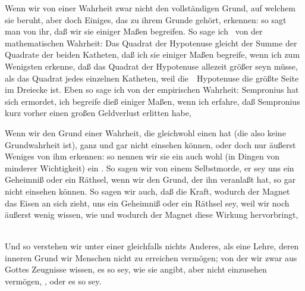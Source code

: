 \begin{aufza}
\item Wenn wir von einer Wahrheit zwar nicht den vollständigen Grund, auf welchem sie beruht, aber doch Einiges, das zu ihrem Grunde gehört, erkennen: so sagt man von ihr, daß wir sie einiger Maßen begreifen. So sage ich \zB\ von der mathematischen Wahrheit: Das Quadrat der Hypotenuse gleicht der Summe der Quadrate der beiden Katheten, daß ich sie einiger Maßen begreife, wenn ich zum Wenigsten erkenne, daß das Quadrat der Hypotenuse allezeit größer seyn müsse, als das Quadrat jedes einzelnen Katheten, weil die~\ Hypotenuse die größte Seite im Dreiecke ist. Eben so sage ich von der empirischen Wahrheit: Sempronius hat sich ermordet, ich begreife dieß einiger Maßen, wenn ich erfahre, daß Sempronius kurz vorher einen großen Geldverlust erlitten habe, \udgl\ 
\item Wenn wir den Grund einer Wahrheit, die gleichwohl einen hat (die also keine Grundwahrheit ist), ganz und gar nicht einsehen können, oder doch nur äußerst Weniges von ihm erkennen: so nennen wir sie ein  auch wohl (in Dingen von minderer Wichtigkeit) ein . So sagen wir von einem Selbstmorde, er sey uns ein Geheimniß oder ein Räthsel, wenn wir den Grund, der ihn veranlaßt hat, so gar nicht einsehen können. So sagen wir auch, daß die Kraft, wodurch der Magnet das Eisen an sich zieht, uns ein Geheimniß oder ein Räthsel sey, weil wir noch äußerst wenig wissen, wie und wodurch der Magnet diese Wirkung hervorbringt, \usw\
\item Und so verstehen wir unter einer  gleichfalls nichts Anderes, als eine Lehre, deren inneren Grund wir Menschen nicht zu erreichen vermögen; von der wir zwar aus Gottes Zeugnisse wissen,  es so sey, wie sie angibt, aber nicht einzusehen vermögen, , oder  es so sey.
\end{aufza}

